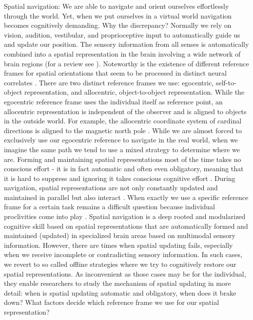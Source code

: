 \documentclass{frontiersSCNS} %
\begin{document}
%
%
Spatial navigation: We are able to navigate and orient ourselves effortlessly through the world. Yet, when we put ourselves in a virtual world navigation becomes cognitively demanding. Why the discrepancy? Normally we rely on vision, audition, vestibular, and proprioceptive input to automatically guide us and update our position.  The sensory information from all senses is automatically combined into a spatial representation in the brain involving a wide network of brain regions (for a review see \cite{Moser2008}). Noteworthy is the existence of different reference frames for spatial orientations that seem to be processed in distinct neural correlates \citep{Gramann2010,Zaehle2007}. There are two distinct reference frames we use: egocentric, self-to-object representation, and allocentric, object-to-object representation. While the egocentric reference frame uses the individual itself as reference point, an allocentric representation is independent of the observer and is aligned to objects in the outside world. For example, the allocentric coordinate system of cardinal directions is aligned to the magnetic north pole \citep{Klatzky1998a}. While we are almost forced to exclusively use our egocentric reference to navigate in the real world, when we imagine the same path we tend to use a mixed strategy to determine where we are. Forming and maintaining spatial representations most of the time takes no conscious effort - it is in fact automatic and often even obligatory, meaning that it is hard to suppress and ignoring it takes conscious cognitive effort \citep{Riecke2005}. During navigation, spatial representations are not only constantly updated and maintained in parallel but also interact \citep{Moser2008}. When exactly we use a specific reference frame for a certain task remains a difficult question because individual proclivities come into play \citep{Gramann2011}. Spatial navigation is a deep rooted and modularized cognitive skill based on spatial representations that are automatically formed and maintained (updated) in specialized brain areas based on multimodal sensory information.
However, there are times when spatial updating fails, especially when we receive incomplete or contradicting sensory information. In such cases, we revert to so called offline strategies where we try to cognitively restore our spatial representations. As inconvenient as those cases may be for the individual, they enable researchers to study the mechanism of spatial updating in more detail: when is spatial updating automatic and obligatory, when does it brake down? What factors decide which reference frame we use for our spatial representation?
\end{document}
